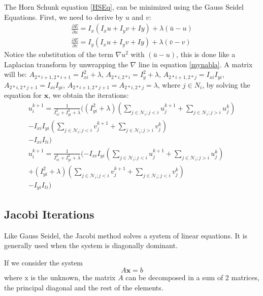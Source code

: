 \documentclass[12pt,a4paper,twoside]{report}
\begin{document}
{The Horn Schunk equation \ref{HSEq}, can be minimized using the Gauss Seidel Equations.
First, we need to derive by $u$  and $v$:
\begin{equation} \label{partialDer}
\begin{split} 
\frac{\partial E}{\partial u} = I_x(I_xu+I_yv+Iy) + \lambda(\bar{u}-u) \\
\frac{\partial E}{\partial v} = I_y(I_xu+I_yv+Iy) + \lambda(\bar{v}-v)
\end{split}
\end{equation}
Notice the substitution of the term $\nabla u ^2$ with $(\bar{u}-u)$, this is done like a Laplacian transform by unwrapping the $\nabla$ line in equation \ref{mynabla}.
 A matrix will be: 
$A_{2*i+1, 2*i+1} = I^2_{xi}+ \lambda$,
 $A_{2*i, 2*i} = I^2_{y}+ \lambda$,
$A_{2*i+1, 2*j} = I_{xi}I_{yi}$,  
$A_{2*i, 2*j+1} = I_{xi}I_{yi}$, 
 $A_{2*i+1, 2*j+1} = A_{2*i, 2*j} = \lambda$, where $j \in N_i $, by solving the equation for $\boldsymbol{x}$, we obtain the iterations:
 \begin{equation} \label{GSEq}
 \begin{split}
 u^{k+1}_i = \frac{1}{I_{xi}^2+I_{yi}^2+ \lambda}
					 (
					 (I_{yi}^2+\lambda)(\sum_{j \in \mathcal{N}_i;j<i} u_j^{k+1} + \sum_{j \in \mathcal{N}_i;j>i} u_j^k) \\
					 -I_{xi}I_{yi}(\sum_{j \in \mathcal{N}_i;j<i} v_j^{k+1} + \sum_{j \in \mathcal{N}_i;j>i} v_j^k)\\
					 -I_{xi}I_{ti}
					)
					 \\
   u^{k+1}_i = \frac{1}{I_{xi}^2+I_{yi}^2+ \lambda}
			   (
			   -I_{xi}I_{yi}(\sum_{j \in \mathcal{N}_i;j<i} u_j^{k+1} + \sum_{j \in \mathcal{N}_i;j>i} u_j^k)\\
			   +(I_{yi}^2+\lambda)(\sum_{j \in \mathcal{N}_i;j<i} v_j^{k+1} + \sum_{j \in \mathcal{N}_i;j<i} v_j^k)\\
			   -I_{yi}I_{ti}
			   )
 \end{split}
 \end{equation}
\subsection{Jacobi Iterations}
Like Gauss Seidel, the Jacobi method solves a system of linear equations. It is generally used when the system is diagonally dominant. 

If we consider the system 
\begin{equation}
	A\boldsymbol{x} = b
\end{equation}
where x is the unknown, the matrix $A$ can be decomposed in a sum of 2 matrices, the principal diagonal and the rest of the elements.

}
\end{document}
